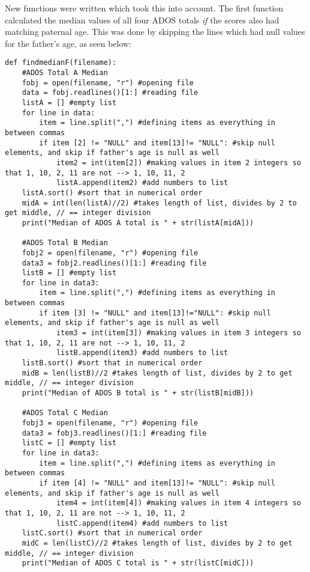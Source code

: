 \documentclass{article}
\begin{document}
New functions were written which took this into account. The first function calculated the median values of all four ADOS totals \textit{if} the scores also had matching paternal age. This was done by skipping the lines which had null values for the father's age, as seen below: 
\begin{verbatim}
def findmedianF(filename):
    #ADOS Total A Median
    fobj = open(filename, "r") #opening file
    data = fobj.readlines()[1:] #reading file
    listA = [] #empty list
    for line in data:
        item = line.split(",") #defining items as everything in between commas
        if item [2] != "NULL" and item[13]!= "NULL": #skip null elements, and skip if father's age is null as well
            item2 = int(item[2]) #making values in item 2 integers so that 1, 10, 2, 11 are not --> 1, 10, 11, 2
            listA.append(item2) #add numbers to list
    listA.sort() #sort that in numerical order
    midA = int(len(listA)//2) #takes length of list, divides by 2 to get middle, // == integer division
    print("Median of ADOS A total is " + str(listA[midA]))
  
    #ADOS Total B Median
    fobj2 = open(filename, "r") #opening file
    data3 = fobj2.readlines()[1:] #reading file
    listB = [] #empty list
    for line in data3:
        item = line.split(",") #defining items as everything in between commas
        if item [3] != "NULL" and item[13]!="NULL": #skip null elements, and skip if father's age is null as well 
            item3 = int(item[3]) #making values in item 3 integers so that 1, 10, 2, 11 are not --> 1, 10, 11, 2
            listB.append(item3) #add numbers to list
    listB.sort() #sort that in numerical order
    midB = len(listB)//2 #takes length of list, divides by 2 to get middle, // == integer division
    print("Median of ADOS B total is " + str(listB[midB]))
    
    #ADOS Total C Median
    fobj3 = open(filename, "r") #opening file
    data3 = fobj3.readlines()[1:] #reading file
    listC = [] #empty list
    for line in data3:
        item = line.split(",") #defining items as everything in between commas
        if item [4] != "NULL" and item[13]!= "NULL": #skip null elements, and skip if father's age is null as well
            item4 = int(item[4]) #making values in item 4 integers so that 1, 10, 2, 11 are not --> 1, 10, 11, 2
            listC.append(item4) #add numbers to list
    listC.sort() #sort that in numerical order
    midC = len(listC)//2 #takes length of list, divides by 2 to get middle, // == integer division
    print("Median of ADOS C total is " + str(listC[midC]))
    

\end{verbatim}
\end{document}
